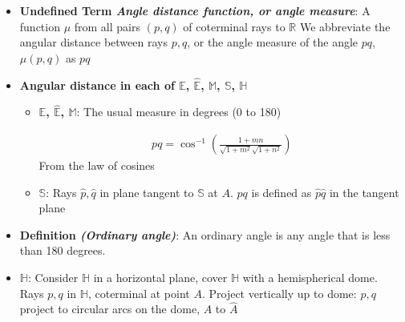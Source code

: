 \documentclass{report}
\begin{document}
\begin{itemize}
        \item \textbf{Undefined Term \textit{Angle distance function, or angle measure}}: A function $\mu$ from all pairs $(p,q) $ of coterminal rays to $\mathbb{R}$
            \bigbreak \noindent 
            We abbreviate the angular distance between rays $p,q$, or the angle measure of the angle $pq$, $\mu(p,q)$ as $pq$ 
            \bigbreak \noindent 
            \begin{figure}[ht]
                \centering
                \label{fig:undef}
            \end{figure}
            \bigbreak \noindent 
        \item \textbf{Angular distance in each of $\mathbb{E}$, $\hat{\mathbb{E}}$, $\mathbb{M}$, $\mathbb{S}$, $\mathbb{H}$}
            \begin{itemize}
                \item \textbf{$\mathbb{E}$, $\hat{\mathbb{E}}$, $\mathbb{M} $}: The usual measure in degrees (0 to 180)
                    \bigbreak \noindent 
                    \begin{figure}[ht]
                        \centering
                        \label{fig:eangle}
                    \end{figure}
                    \bigbreak \noindent 
                    \begin{align*}
                        pq = \cos^{-1}{\left(\frac{1+mn}{\sqrt{1+m^{2}}\sqrt{1+n^{2}}}\right)}
                    \end{align*}
                    From the law of cosines
                \item \textbf{$\mathbb{S}$}: 
                    \bigbreak \noindent 
                    \bigbreak \noindent 
                    Rays $\hat{p}, \hat{q}$ in plane tangent to $\mathbb{S}$ at $A$. $pq$ is defined as $\hat{p}\hat{q}$ in the tangent plane 
            \end{itemize}
                \item \textbf{Definition \textit{(Ordinary angle)}}: An ordinary angle is any angle that is less than 180 degrees.
                \item $\mathbb{H}$: Consider $\mathbb{H}$ in a horizontal plane, cover $\mathbb{H}$ with a hemispherical dome. Rays $p,q$ in $ \mathbb{H}$, coterminal at point $A$. Project vertically up to dome: $p,q$ project to circular arcs on the dome, $A$ to $\hat{A}$

\end{itemize}
\end{document}
